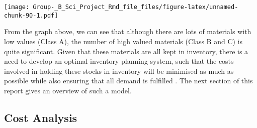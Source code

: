 \documentclass[
]{article}
\begin{document}
\texttt{[image: Group-\_B\_Sci\_Project\_Rmd\_file\_files/figure-latex/unnamed-chunk-90-1.pdf]}

From the graph above, we can see that although there are lots of
materials with low values (Class A), the number of high valued materials
(Class B and C) is quite significant. Given that these materials are all
kept in inventory, there is a need to develop an optimal inventory
planning system, such that the costs involved in holding these stocks in
inventory will be minimised as much as possible while also ensuring that
all demand is fulfilled . The next section of this report gives an
overview of such a model.

\hypertarget{cost-analysis}{%
\subsection{Cost Analysis}\label{cost-analysis}}
\end{document}
